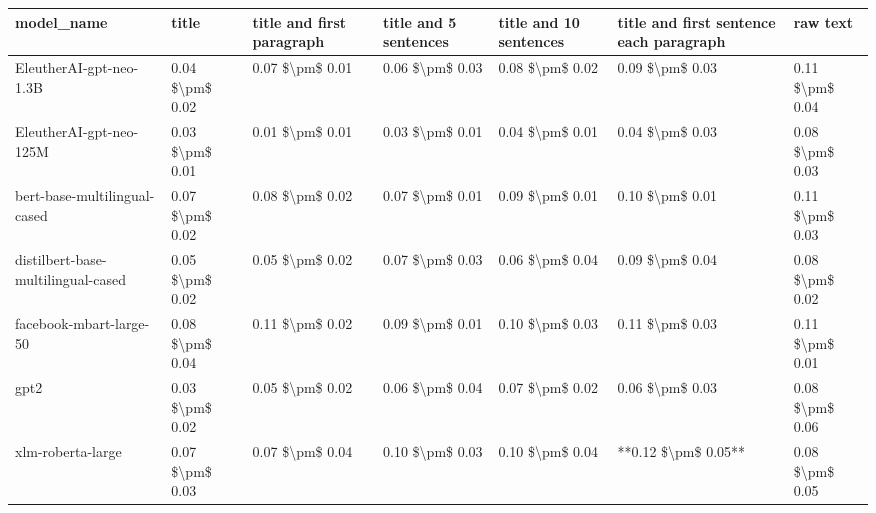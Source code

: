 \begin{tabular}{lllllll}
\toprule
                        model\_name &           title & title and first paragraph & title and 5 sentences & title and 10 sentences & title and first sentence each paragraph &        raw text \\
\midrule
           EleutherAI-gpt-neo-1.3B & 0.04 \$\textbackslash pm\$ 0.02 &           0.07 \$\textbackslash pm\$ 0.01 &       0.06 \$\textbackslash pm\$ 0.03 &        0.08 \$\textbackslash pm\$ 0.02 &                         0.09 \$\textbackslash pm\$ 0.03 & 0.11 \$\textbackslash pm\$ 0.04 \\
           EleutherAI-gpt-neo-125M & 0.03 \$\textbackslash pm\$ 0.01 &           0.01 \$\textbackslash pm\$ 0.01 &       0.03 \$\textbackslash pm\$ 0.01 &        0.04 \$\textbackslash pm\$ 0.01 &                         0.04 \$\textbackslash pm\$ 0.03 & 0.08 \$\textbackslash pm\$ 0.03 \\
      bert-base-multilingual-cased & 0.07 \$\textbackslash pm\$ 0.02 &           0.08 \$\textbackslash pm\$ 0.02 &       0.07 \$\textbackslash pm\$ 0.01 &        0.09 \$\textbackslash pm\$ 0.01 &                         0.10 \$\textbackslash pm\$ 0.01 & 0.11 \$\textbackslash pm\$ 0.03 \\
distilbert-base-multilingual-cased & 0.05 \$\textbackslash pm\$ 0.02 &           0.05 \$\textbackslash pm\$ 0.02 &       0.07 \$\textbackslash pm\$ 0.03 &        0.06 \$\textbackslash pm\$ 0.04 &                         0.09 \$\textbackslash pm\$ 0.04 & 0.08 \$\textbackslash pm\$ 0.02 \\
           facebook-mbart-large-50 & 0.08 \$\textbackslash pm\$ 0.04 &           0.11 \$\textbackslash pm\$ 0.02 &       0.09 \$\textbackslash pm\$ 0.01 &        0.10 \$\textbackslash pm\$ 0.03 &                         0.11 \$\textbackslash pm\$ 0.03 & 0.11 \$\textbackslash pm\$ 0.01 \\
                              gpt2 & 0.03 \$\textbackslash pm\$ 0.02 &           0.05 \$\textbackslash pm\$ 0.02 &       0.06 \$\textbackslash pm\$ 0.04 &        0.07 \$\textbackslash pm\$ 0.02 &                         0.06 \$\textbackslash pm\$ 0.03 & 0.08 \$\textbackslash pm\$ 0.06 \\
                 xlm-roberta-large & 0.07 \$\textbackslash pm\$ 0.03 &           0.07 \$\textbackslash pm\$ 0.04 &       0.10 \$\textbackslash pm\$ 0.03 &        0.10 \$\textbackslash pm\$ 0.04 &                     **0.12 \$\textbackslash pm\$ 0.05** & 0.08 \$\textbackslash pm\$ 0.05 \\
\bottomrule
\end{tabular}
